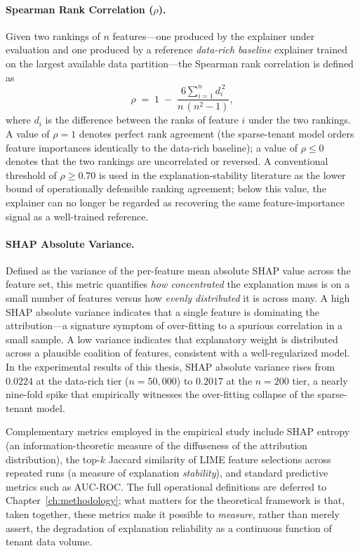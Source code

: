 \paragraph{Spearman Rank Correlation ($\rho$).}
Given two rankings of $n$ features---one produced by the explainer under
evaluation and one produced by a reference \emph{data-rich baseline} explainer
trained on the largest available data partition---the Spearman rank
correlation is defined as
\begin{equation}
\rho \;=\; 1 \;-\; \frac{6 \sum_{i=1}^{n} d_i^{\,2}}{n\,(n^2 - 1)},
\label{eq:spearman}
\end{equation}
where $d_i$ is the difference between the ranks of feature $i$ under the two
rankings. A value of $\rho = 1$ denotes perfect rank agreement (the
sparse-tenant model orders feature importances identically to the data-rich
baseline); a value of $\rho \le 0$ denotes that the two rankings are
uncorrelated or reversed. A conventional threshold of $\rho \ge 0.70$ is used
in the explanation-stability literature as the lower bound of operationally
defensible ranking agreement; below this value, the explainer can no longer
be regarded as recovering the same feature-importance signal as a
well-trained reference.

\paragraph{SHAP Absolute Variance.}
Defined as the variance of the per-feature mean absolute SHAP value across the
feature set, this metric quantifies \emph{how concentrated} the explanation
mass is on a small number of features versus how \emph{evenly distributed} it
is across many. A high SHAP absolute variance indicates that a single feature
is dominating the attribution---a signature symptom of over-fitting to a
spurious correlation in a small sample. A low variance indicates that
explanatory weight is distributed across a plausible coalition of features,
consistent with a well-regularized model. In the experimental results of this
thesis, SHAP absolute variance rises from $0.0224$ at the data-rich tier
($n = 50{,}000$) to $0.2017$ at the $n = 200$ tier, a nearly nine-fold spike
that empirically witnesses the over-fitting collapse of the sparse-tenant
model.

Complementary metrics employed in the empirical study include SHAP entropy
(an information-theoretic measure of the diffuseness of the attribution
distribution), the top-$k$ Jaccard similarity of LIME feature selections
across repeated runs (a measure of explanation \emph{stability}), and
standard predictive metrics such as AUC-ROC. The full operational definitions
are deferred to Chapter~\ref{ch:methodology}; what matters for the theoretical
framework is that, taken together, these metrics make it possible to
\emph{measure}, rather than merely assert, the degradation of explanation
reliability as a continuous function of tenant data volume.

